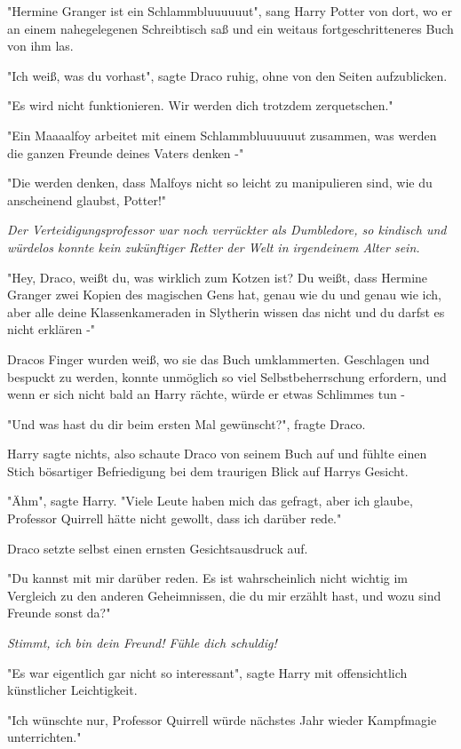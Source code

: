 {"Hermine Granger ist ein Schlammbluuuuuut", sang Harry Potter von dort, wo er an einem nahegelegenen Schreibtisch saß und ein weitaus fortgeschritteneres Buch von ihm las.

"Ich weiß, was du vorhast", sagte Draco ruhig, ohne von den Seiten aufzublicken.

"Es wird nicht funktionieren. Wir werden dich trotzdem zerquetschen."

"Ein Maaaalfoy arbeitet mit einem Schlammbluuuuuut zusammen, was werden die ganzen Freunde deines Vaters denken -"

"Die werden denken, dass Malfoys nicht so leicht zu manipulieren sind, wie du anscheinend glaubst, Potter!"

\emph{Der Verteidigungsprofessor war noch verrückter als Dumbledore, so kindisch und würdelos konnte kein zukünftiger Retter der Welt in irgendeinem Alter sein.}

"Hey, Draco, weißt du, was wirklich zum Kotzen ist? Du weißt, dass Hermine Granger zwei Kopien des magischen Gens hat, genau wie du und genau wie ich, aber alle deine Klassenkameraden in Slytherin wissen das nicht und du darfst es nicht erklären -"

Dracos Finger wurden weiß, wo sie das Buch umklammerten. Geschlagen und bespuckt zu werden, konnte unmöglich so viel Selbstbeherrschung erfordern, und wenn er sich nicht bald an Harry rächte, würde er etwas Schlimmes tun -

"Und was hast du dir beim ersten Mal gewünscht?", fragte Draco.

Harry sagte nichts, also schaute Draco von seinem Buch auf und fühlte einen Stich bösartiger Befriedigung bei dem traurigen Blick auf Harrys Gesicht.

"Ähm", sagte Harry. "Viele Leute haben mich das gefragt, aber ich glaube, Professor Quirrell hätte nicht gewollt, dass ich darüber rede."

Draco setzte selbst einen ernsten Gesichtsausdruck auf.

"Du kannst mit mir darüber reden. Es ist wahrscheinlich nicht wichtig im Vergleich zu den anderen Geheimnissen, die du mir erzählt hast, und wozu sind Freunde sonst da?"

\emph{Stimmt, ich bin dein Freund! Fühle dich schuldig!}

"Es war eigentlich gar nicht so interessant", sagte Harry mit offensichtlich künstlicher Leichtigkeit.

"Ich wünschte nur, Professor Quirrell würde nächstes Jahr wieder Kampfmagie unterrichten."

}
